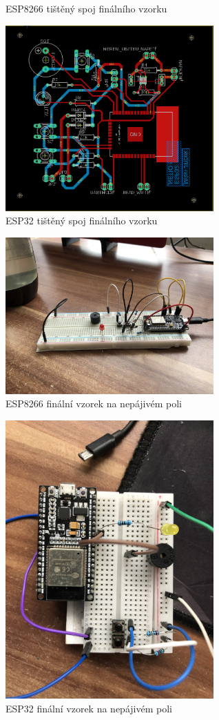 \documentclass[a4paper, 12pt]{report}
\begin{document}
{\begin{figure}
            \caption{ESP8266 tištěný spoj finálního vzorku}
            \label{fig:esp8266_tistak}
        \end{figure}
        \begin{figure}
            \centering
            \includegraphics[width=8cm]{images/ESP32_tisteny_spoj}
            \caption{ESP32 tištěný spoj finálního vzorku}
            \label{fig:esp32_tistak}
        \end{figure}
        \begin{figure}
            \centering
            \includegraphics[width=8cm]{images/esp8266_bread.jpeg}
            \caption{ESP8266 finální vzorek na nepájivém poli}
            \label{fig:esp8266_breadboard}
        \end{figure}
        \begin{figure}
            \centering
            \includegraphics[width=8cm]{images/esp32_bread.jpeg}
            \caption{ESP32 finální vzorek na nepájivém poli}
            \label{fig:esp32_breadboard}
        \end{figure}
    }
\end{document}
